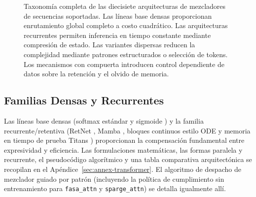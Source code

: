 \begin{figure}[t]
{}
\caption{Taxonomía completa de las diecisiete arquitecturas de mezcladores de secuencias soportadas. Las líneas base densas proporcionan enrutamiento global completo a costo cuadrático. Las arquitecturas recurrentes permiten inferencia en tiempo constante mediante compresión de estado. Las variantes dispersas reducen la complejidad mediante patrones estructurados o selección de tokens. Los mecanismos con compuerta introducen control dependiente de datos sobre la retención y el olvido de memoria.}
\label{fig:comprehensive-taxonomy}
\end{figure}

\subsection{Familias Densas y Recurrentes}
Las líneas base densas (softmax estándar \citep{vaswani_attention_2017} y sigmoide \citep{ramapuram_theory_2024}) y la familia recurrente/retentiva (RetNet \citep{sun_retentive_2023}, Mamba \citep{gu_mamba_2023}, bloques continuos estilo ODE \citep{zhang_continuous_2021} y memoria en tiempo de prueba Titans \citep{behrouz_titans_2025}) proporcionan la compensación fundamental entre expresividad y eficiencia. Las formulaciones matemáticas, las formas paralela y recurrente, el pseudocódigo algorítmico y una tabla comparativa arquitectónica se recopilan en el Apéndice~\ref{sec:annex-transformer}. El algoritmo de despacho de mezclador guiado por patrón (incluyendo la política de cumplimiento sin entrenamiento para \texttt{fasa\_attn} y \texttt{sparge\_attn}) se detalla igualmente allí.

